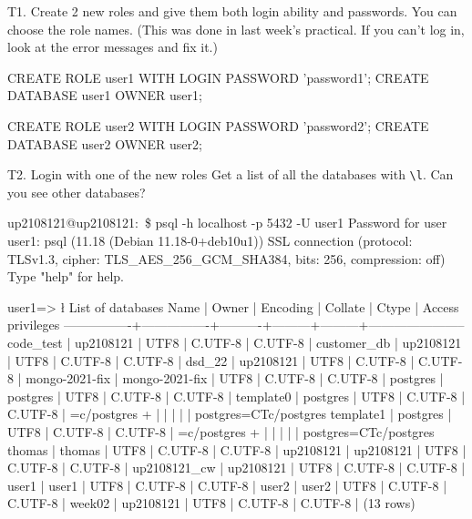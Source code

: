 
T1. Create 2 new roles and give them both login ability and passwords. You can choose the role names. (This was done in last week's practical. If you can't log in, look at the error messages and fix it.)

\begin{sql}
CREATE ROLE user1 WITH LOGIN PASSWORD 'password1';
CREATE DATABASE user1 OWNER user1;

CREATE ROLE user2 WITH LOGIN PASSWORD 'password2';
CREATE DATABASE user2 OWNER user2;
\end{sql}

T2. Login with one of the new roles Get a list of all the databases with \verb|\l|. Can you see other databases?
\begin{pseudo}
up2108121@up2108121:~\$ psql -h localhost -p 5432 -U user1
Password for user user1:
psql (11.18 (Debian 11.18-0+deb10u1))
SSL connection (protocol: TLSv1.3, cipher: TLS_AES_256_GCM_SHA384, bits: 256, compression: off)
Type "help" for help.

user1=> \l
                                   List of databases
      Name      |     Owner      | Encoding | Collate |  Ctype  |   Access privileges
----------------+----------------+----------+---------+---------+-----------------------
 code_test      | up2108121      | UTF8     | C.UTF-8 | C.UTF-8 |
 customer_db    | up2108121      | UTF8     | C.UTF-8 | C.UTF-8 |
 dsd_22         | up2108121      | UTF8     | C.UTF-8 | C.UTF-8 |
 mongo-2021-fix | mongo-2021-fix | UTF8     | C.UTF-8 | C.UTF-8 |
 postgres       | postgres       | UTF8     | C.UTF-8 | C.UTF-8 |
 template0      | postgres       | UTF8     | C.UTF-8 | C.UTF-8 | =c/postgres          +
                |                |          |         |         | postgres=CTc/postgres
 template1      | postgres       | UTF8     | C.UTF-8 | C.UTF-8 | =c/postgres          +
                |                |          |         |         | postgres=CTc/postgres
 thomas         | thomas         | UTF8     | C.UTF-8 | C.UTF-8 |
 up2108121      | up2108121      | UTF8     | C.UTF-8 | C.UTF-8 |
 up2108121_cw   | up2108121      | UTF8     | C.UTF-8 | C.UTF-8 |
 user1          | user1          | UTF8     | C.UTF-8 | C.UTF-8 |
 user2          | user2          | UTF8     | C.UTF-8 | C.UTF-8 |
 week02         | up2108121      | UTF8     | C.UTF-8 | C.UTF-8 |
(13 rows)
\end{pseudo}

